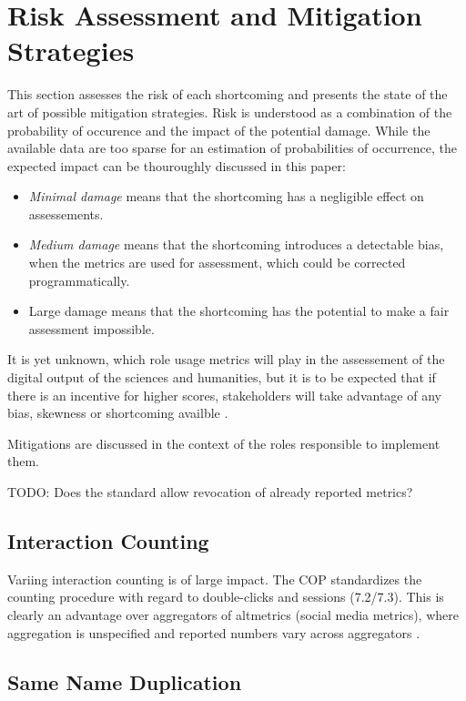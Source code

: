 \documentclass[conference, a4paper]{IEEEtran}\usepackage[]{graphicx}\usepackage[]{color}
\begin{document}
\section{Risk Assessment and Mitigation Strategies}\label{sec:mitigation}
This section assesses the risk of each shortcoming and presents the state of the art
of possible mitigation strategies.
Risk is understood as a combination of the probability of occurence and
the impact of the potential damage.
While the available data are too sparse for an estimation of probabilities of occurrence,
the expected impact can be thouroughly discussed in this paper:
\begin{itemize}
    \item \emph{Minimal damage} means that the shortcoming has a negligible effect
        on assessements.
    \item \emph{Medium damage} means that the shortcoming introduces a detectable
        bias, when the metrics are used for assessment, which could be corrected programmatically.
    \item{Large damage} means that the shortcoming has the potential to make a
        fair assessment impossible.
\end{itemize}
It is yet unknown, which role usage metrics will play in the assessement of the digital output
of the sciences and humanities,
but it is to be expected that if there is an incentive for higher scores,
stakeholders will take advantage of any bias, skewness or shortcoming availble \cite{campbell}.

Mitigations are discussed in the context of the roles responsible to implement them.

TODO: Does the standard allow revocation of already reported metrics?

\subsection{Interaction Counting}
Variing interaction counting is of large impact.
The COP standardizes the counting procedure with regard to double-clicks
and sessions (7.2/7.3).
This is clearly an advantage over aggregators of altmetrics (social media metrics),
where aggregation is unspecified and reported numbers vary across aggregators \cite{sh057}.

\subsection{Same Name Duplication}
\end{document}
